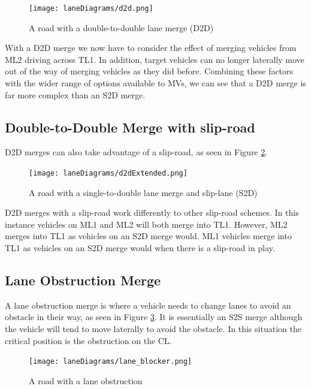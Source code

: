 \begin{figure}[htb]
\texttt{[image: laneDiagrams/d2d.png]}
\caption{A road with a double-to-double lane merge (D2D)}
\label{fig:D2DMerge}
\end{figure}

With a D2D merge we now have to consider the effect of merging vehicles from ML2 driving across TL1. In addition, target vehicles can no longer laterally move out of the way of merging vehicles as they did before. Combining these factors with the wider range of options available to MVs, we can see that a D2D merge is far more complex than an S2D merge.

\subsection{Double-to-Double Merge with slip-road}
\label{subsec:Double-to-Double Merge with slip-road}

D2D merges can also take advantage of a slip-road, as seen in Figure \ref{fig:D2DMergeExtended}.

\begin{figure}[htb]
\texttt{[image: laneDiagrams/d2dExtended.png]}
\caption{A road with a single-to-double lane merge and slip-lane (S2D)}
\label{fig:D2DMergeExtended}
\end{figure}

D2D merges with a slip-road work differently to other slip-road schemes. In this instance vehicles on ML1 and ML2 will both merge into TL1. However, ML2 merges into TL1 as vehicles on an S2D merge would. ML1 vehicles merge into TL1 as vehicles on an S2D merge would when there is a slip-road in play.

\subsection{Lane Obstruction Merge}
\label{subsec:Lane Obstruction Merge}
A lane obstruction merge is where a vehicle needs to change lanes to avoid an obstacle in their way, as seen in Figure \ref{fig:LaneObstruction}. It is essentially an S2S merge although the vehicle will tend to move laterally to avoid the obstacle. In this situation the critical position is the obstruction on the CL. 

\begin{figure}[htb]
\texttt{[image: laneDiagrams/lane\_blocker.png]}
\caption{A road with a lane obstruction}
\label{fig:LaneObstruction}
\end{figure}


